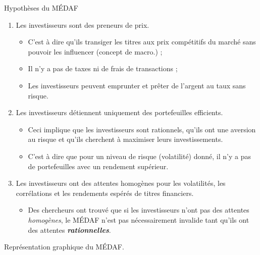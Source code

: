 \documentclass[10pt, french]{article}
\begin{document}
\begin{multicols*}{2}
\begin{conceptgen}{Hypothèses du MÉDAF}
\begin{enumerate}
	\item	Les investisseurs sont des preneurs de prix.
		\begin{itemize}
		\item	C'est à dire qu'ils transiger les titres aux prix compétitifs du marché sans pouvoir les influencer (concept de macro.) ;
		\item	Il n'y a pas de taxes ni de frais de transactions ;
		\item	Les investisseurs peuvent emprunter et prêter de l'argent au taux sans risque.
		\end{itemize}
	\item	Les investisseurs détiennent uniquement des portefeuilles efficients.
		\begin{itemize}
		\item	Ceci implique que les investisseurs sont rationnels, qu’ils ont une aversion au risque et qu'ils cherchent à maximiser leurs investissements.
		\item	C'est à dire que pour un niveau de risque (volatilité) donné, il n'y a pas de portefeuilles avec un rendement supérieur. 
		\end{itemize}
	\item	Les investisseurs ont des attentes homogènes pour les volatilités, les corrélations et les rendements espérés de titres financiers.
		\begin{itemize}
		\item	Des chercheurs ont trouvé que si les investisseurs n'ont pas des attentes \textit{homogènes}, le MÉDAF n'est pas nécessairement invalide tant qu'ils ont des attentes \textit{\textbf{rationnelles}}.
		\end{itemize}
\end{enumerate}
\end{conceptgen}

\begin{definitionNOHFILLsub}
Représentation graphique du MÉDAF.

\begin{center}

\begin{tikzpicture}[x=0.75pt,y=0.75pt,yscale=-1,xscale=1]


\end{tikzpicture}
\end{center}
\end{definitionNOHFILLsub}
\end{multicols*}
\end{document}
